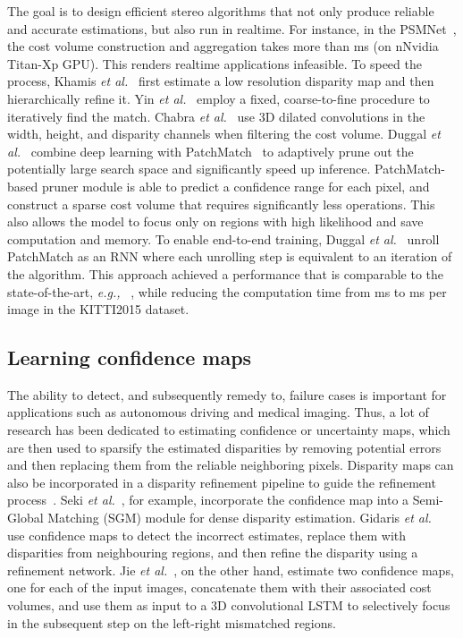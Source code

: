 \documentclass[10pt,journal,compsoc]{IEEEtran}
\newcommand{\eg}{\emph{e.g., }}
\newcommand{\etal}{\emph{et al.}}
\begin{document}
The goal  is to design  efficient stereo algorithms that not only produce reliable and accurate estimations, but also run in realtime.  For instance, in the PSMNet~\cite{chang2018pyramid}, the  cost volume construction and aggregation takes more than ms (on nNvidia Titan-Xp GPU). This renders  realtime applications infeasible. To speed the process, Khamis \etal~\cite{khamis2018stereonet} first estimate a low resolution disparity map and then hierarchically refine it. Yin \etal~\cite{yin2019hierarchical} employ a fixed, coarse-to-fine procedure to iteratively find the match.  Chabra \etal~\cite{chabra2019stereodrnet} use 3D dilated convolutions  in the width, height, and disparity channels when filtering the cost volume. Duggal \etal~\cite{Duggal_2019_ICCV}  combine deep learning with PatchMatch~\cite{barnes2009patchmatch} to adaptively prune out the potentially large search space and significantly speed up inference. PatchMatch-based pruner module  is able to predict a confidence range for each pixel, and construct a sparse cost volume that requires significantly less operations. This also allows the model to focus only on regions with high likelihood and save computation and memory. To enable end-to-end training,  Duggal \etal~\cite{Duggal_2019_ICCV}  unroll  PatchMatch as an RNN where each unrolling step is equivalent to an iteration of the algorithm.  This approach  achieved a performance that is comparable to the state-of-the-art, \eg~\cite{chang2018pyramid,yang2018segstereo},  while reducing the computation time from ms to ms per image in the KITTI2015 dataset.


\subsection{Learning confidence maps}
\label{sec:confidencemaps}

The ability to detect, and subsequently remedy to,  failure cases is important for applications such as autonomous driving and medical imaging. Thus, a lot of research has been dedicated to estimating confidence or uncertainty maps, which are then used to sparsify the estimated disparities by removing potential errors and then replacing them from the reliable neighboring pixels.  Disparity maps can also be incorporated in a disparity refinement pipeline to guide the refinement process~\cite{seki2016patch,gidaris2017detect,jie2018left}.  Seki \etal~\cite{seki2016patch}, for example,  incorporate the confidence map  into a Semi-Global Matching (SGM) module for dense disparity estimation. Gidaris \etal~\cite{gidaris2017detect} use confidence maps to detect the incorrect estimates, replace them with disparities from neighbouring regions, and then refine the disparity using a refinement network. Jie \etal~\cite{jie2018left}, on the other hand,  estimate two confidence maps, one for each of the input images,  concatenate them with their associated cost volumes, and use them  as input  to a 3D convolutional LSTM  to selectively focus in  the subsequent step on the left-right mismatched regions. 
\end{document}
